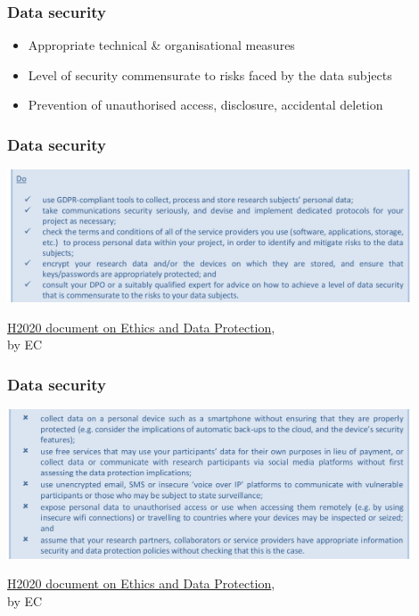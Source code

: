 \documentclass[17pt,aspectratio=169,hyperref={pdfusetitle,colorlinks,allcolors=olive}]{beamer}
\begin{document}
\begin{frame}[fragile]
  \frametitle{Data security}

 
  \begin{itemize}
  \item Appropriate  technical \& organisational measures
  \item Level of security commensurate to risks faced by the  data  subjects
  \item Prevention of unauthorised access, disclosure, accidental deletion
  \end{itemize}
\end{frame}

\begin{frame}[fragile]
  \frametitle{Data security}

  \begin{center}
  \includegraphics[width=12cm]{figs/gdpr-data-security}
  \end{center}  
  
  {\footnotesize
    \begin{flushright}
    \href{https://ec.europa.eu/research/participants/data/ref/h2020/grants_manual/hi/ethics/h2020_hi_ethics-data-protection_en.pdf}{H2020 document on Ethics and Data Protection}, \\ by EC
  \end{flushright}
  }
 
\end{frame}

\begin{frame}[fragile]
  \frametitle{Data security}

  \begin{center}
  \includegraphics[width=12cm]{figs/gdpr-data-security-b}
  \end{center}  
  
  {\footnotesize
    \begin{flushright}
    \href{https://ec.europa.eu/research/participants/data/ref/h2020/grants_manual/hi/ethics/h2020_hi_ethics-data-protection_en.pdf}{H2020 document on Ethics and Data Protection}, \\ by EC
  \end{flushright}
  }
 
\end{frame}
\end{document}
